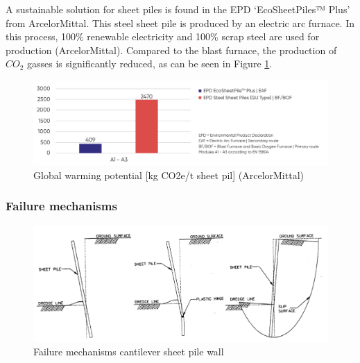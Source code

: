 A sustainable solution for sheet piles is found in the EPD ‘EcoSheetPiles™ Plus’ from ArcelorMittal. This steel sheet pile is produced by an electric arc furnace. In this process, 100\% renewable electricity and 100\% scrap steel are used for production (ArcelorMittal). Compared to the blast furnace, the production of $CO_{2}$ gasses is significantly reduced, as can be seen in Figure \ref{fig:eaf_bof}.

\begin{figure}[H]
    \centering
    \includegraphics[width=0.70\linewidth]{figures/ch8/eaf_bof.png}
    \caption{Global warming potential [kg CO2e/t sheet pil] (ArcelorMittal)}
    \label{fig:eaf_bof}
\end{figure}


\subsubsection{Failure mechanisms}

\begin{figure}[H]
    \centering
    \includegraphics[width=0.70\linewidth]{figures/ch8/failure_mechanisms.png}
    \caption{Failure mechanisms cantilever sheet pile wall}
    \label{fig:failure_mechanisms_sheetpiles}
\end{figure}


\newpage

